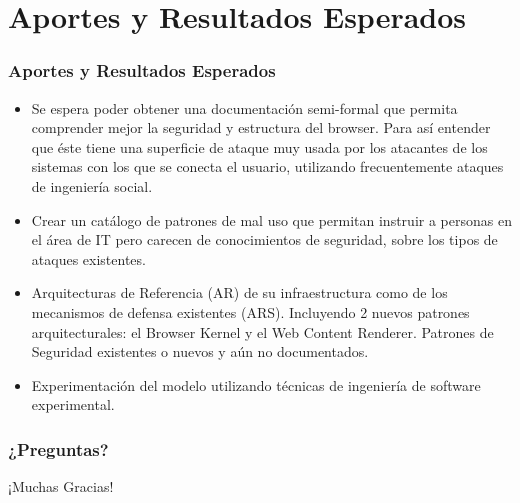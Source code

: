 \documentclass[serif,9pt]{beamer}
\begin{document}
\section{Aportes y Resultados Esperados}
\begin{frame}
	\frametitle{Aportes y Resultados Esperados}
	\begin{itemize}
		\item Se espera poder obtener una documentación semi-formal que permita comprender mejor la seguridad y estructura del browser. Para así entender que éste tiene una superficie de ataque muy usada por los atacantes de los sistemas con los que se conecta el usuario, utilizando frecuentemente ataques de ingeniería social.
		\item Crear un catálogo de patrones de mal uso que permitan instruir a personas en el área de IT pero carecen de conocimientos de seguridad, sobre los tipos de ataques existentes.
		\item Arquitecturas de Referencia (AR) de su infraestructura como de los mecanismos de defensa existentes (ARS). Incluyendo 2 nuevos patrones arquitecturales: el Browser Kernel y el Web Content Renderer. Patrones de Seguridad existentes o nuevos y aún no documentados.
		\item Experimentación del modelo utilizando técnicas de ingeniería de software experimental.
	\end{itemize}
\end{frame}


\begin{frame}
	\frametitle{¿Preguntas?}
	¡Muchas Gracias!	
\end{frame}



\end{document}
